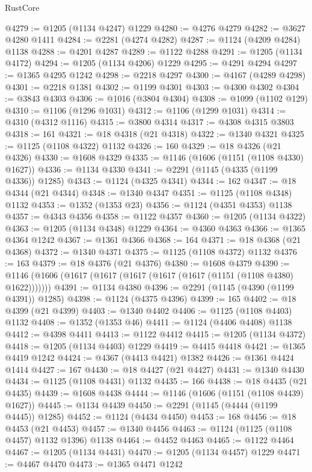 \begin{lexlean}{RustCore}
\begin{coremodule}
@4279 := @1205 (@1134 @4247) @1229
@4280 := @4276 @4279
@4282 := @3627 @4280 @1411
@4284 := @2281 (@4274 @4282)
@4287 := @1124 (@4209 @4284) @1138
@4288 := @4201 @4287
@4289 := @1122 @4288
@4291 := @1205 (@1134 @4172)
@4294 := @1205 (@1134 @4206) @1229
@4295 := @4291 @4294
@4297 := @1365 @4295 @1242
@4298 := @2218 @4297
@4300 := @4167 (@4289 @4298)
@4301 := @2218 @1381
@4302 := @1199 @4301
@4303 := @4300 @4302
@4304 := @3843 @4303
@4306 := @1016 (@3804 @4304)
@4308 := @1099 (@1102 @129)
@4310 := @1106 (@1296 @1031)
@4312 := @1106 (@1299 @1031)
@4314 := @4310 (@4312 @1116)
@4315 := @3800 @4314
@4317 := @4308 @4315 @3803
@4318 := 161
@4321 := @18 @4318 (@21 @4318)
@4322 := @1340 @4321
@4325 := @1125 (@1108 @4322) @1132
@4326 := 160
@4329 := @18 @4326 (@21 @4326)
@4330 := @1608 @4329
@4335 := @1146 (@1606 (@1151 (@1108 @4330) @1627))
@4336 := @1134 @4330
@4341 := @2291 (@1145 (@4335 (@1199 @4336)) @1285)
@4343 := @1124 (@4325 @4341)
@4344 := 162
@4347 := @18 @4344 (@21 @4344)
@4348 := @1340 @4347
@4351 := @1125 (@1108 @4348) @1132
@4353 := @1352 (@1353 @23)
@4356 := @1124 (@4351 @4353) @1138
@4357 := @4343 @4356
@4358 := @1122 @4357
@4360 := @1205 (@1134 @4322)
@4363 := @1205 (@1134 @4348) @1229
@4364 := @4360 @4363
@4366 := @1365 @4364 @1242
@4367 := @1361 @4366
@4368 := 164
@4371 := @18 @4368 (@21 @4368)
@4372 := @1340 @4371
@4375 := @1125 (@1108 @4372) @1132
@4376 := 163
@4379 := @18 @4376 (@21 @4376)
@4380 := @1608 @4379
@4390 := @1146 (@1606 (@1617 (@1617 (@1617 (@1617 (@1617 (@1151 (@1108 @4380) @1622)))))))
@4391 := @1134 @4380
@4396 := @2291 (@1145 (@4390 (@1199 @4391)) @1285)
@4398 := @1124 (@4375 @4396)
@4399 := 165
@4402 := @18 @4399 (@21 @4399)
@4403 := @1340 @4402
@4406 := @1125 (@1108 @4403) @1132
@4408 := @1352 (@1353 @46)
@4411 := @1124 (@4406 @4408) @1138
@4412 := @4398 @4411
@4413 := @1122 @4412
@4415 := @1205 (@1134 @4372)
@4418 := @1205 (@1134 @4403) @1229
@4419 := @4415 @4418
@4421 := @1365 @4419 @1242
@4424 := @4367 (@4413 @4421) @1382
@4426 := @1361 @4424 @1414
@4427 := 167
@4430 := @18 @4427 (@21 @4427)
@4431 := @1340 @4430
@4434 := @1125 (@1108 @4431) @1132
@4435 := 166
@4438 := @18 @4435 (@21 @4435)
@4439 := @1608 @4438
@4444 := @1146 (@1606 (@1151 (@1108 @4439) @1627))
@4445 := @1134 @4439
@4450 := @2291 (@1145 (@4444 (@1199 @4445)) @1285)
@4452 := @1124 (@4434 @4450)
@4453 := 168
@4456 := @18 @4453 (@21 @4453)
@4457 := @1340 @4456
@4463 := @1124 (@1125 (@1108 @4457) @1132 @1396) @1138
@4464 := @4452 @4463
@4465 := @1122 @4464
@4467 := @1205 (@1134 @4431)
@4470 := @1205 (@1134 @4457) @1229
@4471 := @4467 @4470
@4473 := @1365 @4471 @1242

\end{coremodule}
\end{lexlean}
